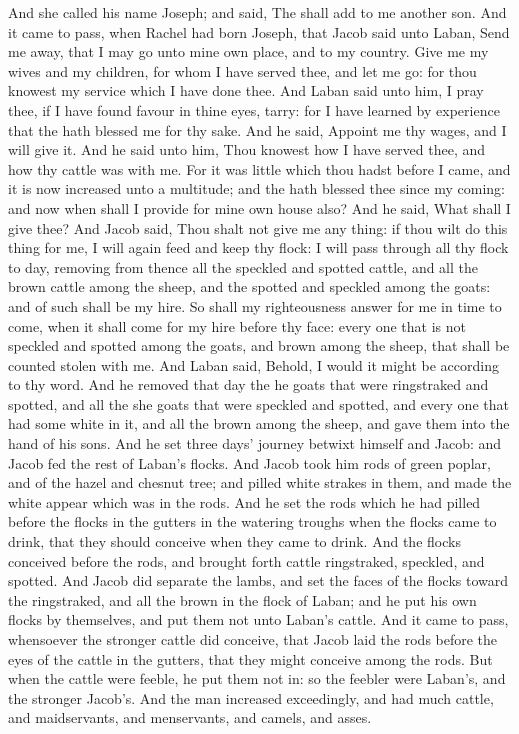 \begin{biblechapter}
\verse And she called his name Joseph; and said, The \LORD shall add to me another son.
 And it came to pass, when Rachel had born Joseph, that Jacob said unto Laban, Send me away, that I may go unto mine own place, and to my country.
\verse Give me my wives and my children, for whom I have served thee, and let me go: for thou knowest my service which I have done thee.
\verse And Laban said unto him, I pray thee, if I have found favour in thine eyes, tarry: for I have learned by experience that the \LORD hath blessed me for thy sake.
\verse And he said, Appoint me thy wages, and I will give it.
\verse And he said unto him, Thou knowest how I have served thee, and how thy cattle was with me.
\verse For it was little which thou hadst before I came, and it is now increased unto a multitude; and the \LORD hath blessed thee since my coming: and now when shall I provide for mine own house also?
\verse And he said, What shall I give thee? And Jacob said, Thou shalt not give me any thing: if thou wilt do this thing for me, I will again feed and keep thy flock:
\verse I will pass through all thy flock to day, removing from thence all the speckled and spotted cattle, and all the brown cattle among the sheep, and the spotted and speckled among the goats: and of such shall be my hire.
\verse So shall my righteousness answer for me in time to come, when it shall come for my hire before thy face: every one that is not speckled and spotted among the goats, and brown among the sheep, that shall be counted stolen with me.
\verse And Laban said, Behold, I would it might be according to thy word.
\verse And he removed that day the he goats that were ringstraked and spotted, and all the she goats that were speckled and spotted, and every one that had some white in it, and all the brown among the sheep, and gave them into the hand of his sons.
\verse And he set three days' journey betwixt himself and Jacob: and Jacob fed the rest of Laban's flocks.
\verse And Jacob took him rods of green poplar, and of the hazel and chesnut tree; and pilled white strakes in them, and made the white appear which was in the rods.
\verse And he set the rods which he had pilled before the flocks in the gutters in the watering troughs when the flocks came to drink, that they should conceive when they came to drink.
\verse And the flocks conceived before the rods, and brought forth cattle ringstraked, speckled, and spotted.
\verse And Jacob did separate the lambs, and set the faces of the flocks toward the ringstraked, and all the brown in the flock of Laban; and he put his own flocks by themselves, and put them not unto Laban's cattle.
\verse And it came to pass, whensoever the stronger cattle did conceive, that Jacob laid the rods before the eyes of the cattle in the gutters, that they might conceive among the rods.
\verse But when the cattle were feeble, he put them not in: so the feebler were Laban's, and the stronger Jacob's.
\verse And the man increased exceedingly, and had much cattle, and maidservants, and menservants, and camels, and asses.
\end{biblechapter}

